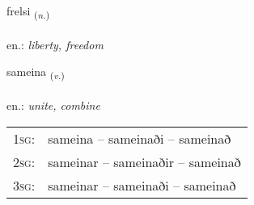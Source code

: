 \documentclass[frontgrid, backgrid]{flacards}\usepackage[]{graphicx}\usepackage[]{xcolor}
\begin{document}
\renewcommand{\flhead}{\vskip5pt \fboxsep=0pt {\small\bfseries\footnotesize Nafnorð | Noun}}
\renewcommand{\fcfoot}{\vskip5pt \fboxsep=0pt \hspace{2pt}{\small\bfseries\footnotesize 2K}}

\renewcommand{\blhead}{\vskip5pt {\small\bfseries\footnotesize Nafnorð | Noun }}
\renewcommand{\bcfoot}{\vskip5pt \hspace{2pt}{\small\bfseries\footnotesize 2K}}


{frelsi \small{\textsubscript{(\textit{n.})}} \\[1ex] %
\textphonetic{[frɛlsɪ]} \\
en.: \emph{liberty, freedom} \\  [2ex]
\renewcommand*{\arraystretch}{0.8}
}

\renewcommand{\flhead}{\vskip5pt \fboxsep=0pt {\small\bfseries\footnotesize Sagnorð | Verb}}
\renewcommand{\fcfoot}{\vskip5pt \fboxsep=0pt \hspace{2pt}{\small\bfseries\footnotesize 2K}}

\renewcommand{\blhead}{\vskip5pt {\small\bfseries\footnotesize Sagnorð | Verb }}
\renewcommand{\bcfoot}{\vskip5pt \hspace{2pt}{\small\bfseries\footnotesize 2K}}


{sameina \small{\textsubscript{(\textit{v.})}} \\[1ex] %
\textphonetic{[saːmeina]} \\
en.: \emph{unite, combine} \\  [2ex]
\renewcommand*{\arraystretch}{0.8}
\begin{tabular}{p{1cm}l}
\textsc{1sg}: & sameina -- sameinaði -- sameinað \\ 
\textsc{2sg}: & sameinar -- sameinaðir -- sameinað \\ 
\textsc{3sg}: & sameinar -- sameinaði -- sameinað \\ 
\end{tabular}
}
\end{document}
